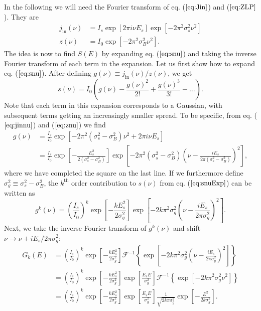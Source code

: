 In the following we will need the Fourier transform of eq. ($\ref{eq:Jin}$) and ($\ref{eq:ZLP}$). They are
\begin{align}
\label{eq:jinnu}
j_{\mathrm{in}}(\nu) &= I_s\exp[2\pi i \nu E_s]\exp[-2\pi^2\sigma_s^2\nu^2]\\
z(\nu)&=I_0\exp[-2\pi^2\sigma_B^2\nu^2].
\label{eq:znu}
\end{align}
The idea is now to find $S(E)$ by expanding eq. ($\ref{eq:snu}$) and taking the inverse Fourier transform of each term in the expansion. Let us first show how to expand eq. ($\ref{eq:snu}$). After defining $g(\nu)\equiv j_{\mathrm{in}}(\nu)/z(\nu)$, we get
\begin{equation}
s(\nu) = I_0\left(g(\nu)-\frac{g(\nu)^2}{2!}+\frac{g(\nu)^3}{3!}-\dots\right).
\label{eq:snuExp}
\end{equation}
Note that each term in this expansion corresponds to a Gaussian, with subsequent terms getting an increasingly smaller spread. To be specific, from eq. ($\ref{eq:jinnu}$) and ($\ref{eq:znu}$) we find
\begin{align}
\nonumber g(\nu ) &= \frac{I_s}{I_0}\exp[-2\pi^2(\sigma_s^2-\sigma_B^2)\nu^2 + 2\pi i \nu E_s]\\
&= \frac{I_s}{I_0}\exp\left[-\frac{E_s^2}{2(\sigma_s^2-\sigma_B^2)}\right]\exp\left[-2\pi^2(\sigma_s^2-\sigma_B^2)\left(\nu - \frac{iE_s}{2\pi(\sigma_s^2-\sigma_B^2)}\right)^2\right],
\end{align}
where we have completed the square on the last line. If we furthermore define $\sigma_g^2 \equiv \sigma_s^2-\sigma_B^2$, the $k^{\mathrm{th}}$ order contribution to $s(\nu)$ from eq. ($\ref{eq:snuExp}$) can be written as
\begin{equation}
g^k(\nu) = \left(\frac{I_s}{I_0}\right)^k\exp\left[-\frac{kE_s^2}{2\sigma_g^2}\right]\exp\left[-2k\pi^2\sigma_g^2\left(\nu - \frac{iE_s}{2\pi\sigma_g^2}\right)^2\right].
\end{equation}
Next, we take the inverse Fourier transform of $g^k(\nu)$ and shift $\nu \rightarrow \nu + iE_s/2\pi\sigma_g^2$:
\begin{align}
\nonumber G_{k}(E) &= \left(\frac{I_s}{I_0}\right)^k\exp\left[-\frac{kE_s^2}{2\sigma_g^2}\right]\mathcal{F}^{-1}\left\{\exp\left[-2k\pi^2\sigma_g^2\left(\nu - \frac{iE_s}{2\pi\sigma_g^2}\right)^2\right]\right\}\\
\nonumber&= \left(\frac{I_s}{I_0}\right)^k\exp\left[-\frac{kE_s^2}{2\sigma_g^2}\right]\exp\left[\frac{E_sE}{\sigma_g^2}\right]\mathcal{F}^{-1}\left\{\exp[-2k\pi^2\sigma_g^2\nu^2]\right\}\\
&=\left(\frac{I_s}{I_0}\right)^k\exp\left[-\frac{kE_s^2}{2\sigma_g^2}\right]\exp\left[\frac{E_sE}{\sigma_g^2}\right]\frac{1}{\sqrt{2k\pi\sigma_g^2}}\exp\left[-\frac{E^2}{2k\sigma_g^2}\right].
\label{eq:GkE}
\end{align}
